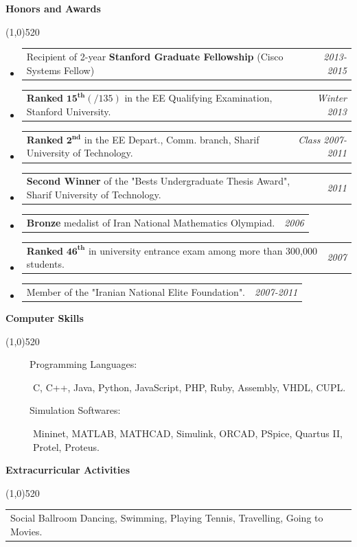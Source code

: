 \documentclass[letterpaper,10pt]{article}
\makeatletter
\newcommand{\heading}[1] {
  {\large
    \begin{minipage}
    {\textwidth}
    {\textbf{#1}}
    \end{minipage}
  }
  \begin{center}
  \vspace{-15pt}
  \line(1,0){520}
  \end{center}
}
\newcommand{\template}[2]{
\begin{tabular*}{7.0in}{l@{\extracolsep{\fill}}r}
		#1 & \textit{#2} \\
\end{tabular*}\vspace{-1pt}}
\makeatother
\begin{document}
\heading{Honors and Awards}
\begin{itemize}
\item  \template{Recipient of 2-year \textbf {Stanford Graduate Fellowship} (Cisco Systems Fellow)}{2013-2015}
\item  \template{\textbf{Ranked} $\mathbf{15^{th}}(/135)$ in the EE Qualifying Examination, Stanford University.}{Winter 2013}
\item  \template{\textbf{Ranked} $\mathbf{2^{nd}}$ in the EE Depart., Comm. branch, Sharif University of Technology.}{Class 2007-2011}

\item \template{ \textbf{Second Winner} of the "Bests Undergraduate Thesis Award", Sharif University of Technology.}{2011}


\item \template{\textbf{Bronze} medalist of Iran National Mathematics Olympiad.}{2006}

\item \template{\textbf{Ranked} $\mathbf{46^{th}}$ in university entrance exam among more than 300,000 students.}{2007}

\item \template{Member of the "Iranian National Elite Foundation".}{2007-2011} 

\end{itemize}

\heading{Computer Skills}

\begin{description}
\item[~~~~~Programming Languages:]
C, C++, Java, Python, JavaScript, PHP, Ruby, Assembly, VHDL, CUPL.
\item[~~~~~Simulation Softwares:]
Mininet, MATLAB, MATHCAD, Simulink, ORCAD, PSpice, Quartus II, Protel, Proteus.
\end{description}






\heading{Extracurricular Activities}

\template{Social Ballroom Dancing, Swimming, Playing Tennis, Travelling, Going to Movies.}{~}
\vspace{5pt}
\end{document}
